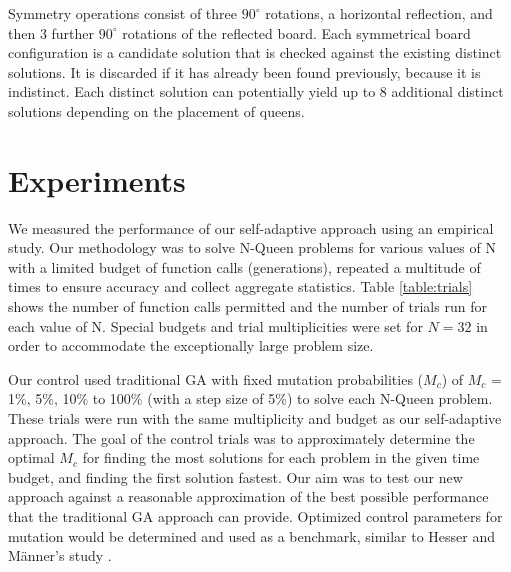 \documentclass[conference]{IEEEtran}
\begin{document}
Symmetry operations consist of three $90^{\circ}$ rotations, a horizontal reflection, and then 3 further $90^{\circ}$ rotations of the reflected board. Each symmetrical board configuration is a candidate solution that is checked against the existing distinct solutions. It is discarded if it has already been found previously, because it is indistinct. Each distinct solution can potentially yield up to 8 additional distinct solutions depending on the placement of queens.

\section{Experiments}
We measured the performance of our self-adaptive approach using an empirical study. Our methodology was to solve N-Queen problems for various values of N with a limited budget of function calls (generations), repeated a multitude of times to ensure accuracy and collect aggregate statistics. Table \ref{table:trials} shows the number of function calls permitted and the number of trials run for each value of N. Special budgets and trial multiplicities were set for $N = 32$ in order to accommodate the exceptionally large problem size.

Our control used traditional GA with fixed mutation probabilities ($M_{c}$) of $M_{c}$ = 1\%, 5\%, 10\% to 100\% (with a step size of 5\%) to solve each N-Queen problem. These trials were run with the same multiplicity and budget as our self-adaptive approach. The goal of the control trials was to approximately determine the optimal $M_{c}$ for finding the most solutions for each problem in the given time budget, and finding the first solution fastest. Our aim was to test our new approach against a reasonable approximation of the best possible performance that the traditional GA approach can provide. Optimized control parameters for mutation would be determined and used as a benchmark, similar to Hesser and M\"{a}nner's study \cite{cit:14}.
\end{document}

